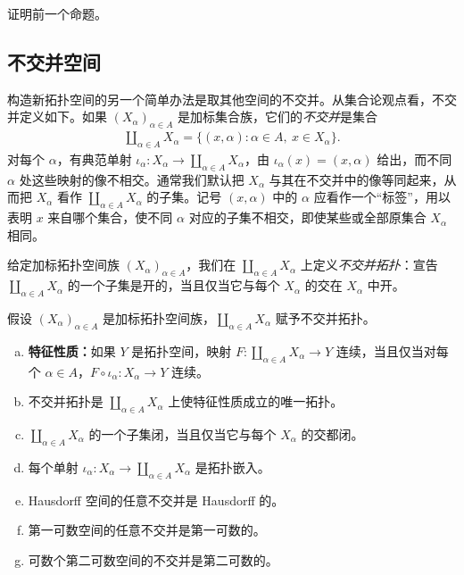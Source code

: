 \documentclass[../../main.tex]{subfiles}
\begin{document}
\begin{exercise}\label{exercise:appA-A-24}
证明前一个命题。
\end{exercise}

\subsection*{不交并空间}

构造新拓扑空间的另一个简单办法是取其他空间的不交并。从集合论观点看，不交并定义如下。如果 $(X_\alpha)_{\alpha\in A}$ 是加标集合族，它们的\emph{不交并}是集合
\begin{align*}
\coprod_{\alpha\in A}X_\alpha=\{(x,\alpha):\alpha\in A,\ x\in X_\alpha\}.
\end{align*}
对每个 $\alpha$，有典范单射 $\iota_\alpha:X_\alpha\to\coprod_{\alpha\in A}X_\alpha$，由 $\iota_\alpha(x)=(x,\alpha)$ 给出，而不同 $\alpha$ 处这些映射的像不相交。通常我们默认把 $X_\alpha$ 与其在不交并中的像等同起来，从而把 $X_\alpha$ 看作 $\coprod_{\alpha\in A}X_\alpha$ 的子集。记号 $(x,\alpha)$ 中的 $\alpha$ 应看作一个“标签”，用以表明 $x$ 来自哪个集合，使不同 $\alpha$ 对应的子集不相交，即使某些或全部原集合 $X_\alpha$ 相同。

给定加标拓扑空间族 $(X_\alpha)_{\alpha\in A}$，我们在 $\coprod_{\alpha\in A}X_\alpha$ 上定义\emph{不交并拓扑}：宣告 $\coprod_{\alpha\in A}X_\alpha$ 的一个子集是开的，当且仅当它与每个 $X_\alpha$ 的交在 $X_\alpha$ 中开。

\begin{proposition}[不交并拓扑的性质]\label{proposition:appA-disjoint-union-properties}
假设 $(X_\alpha)_{\alpha\in A}$ 是加标拓扑空间族，$\coprod_{\alpha\in A}X_\alpha$ 赋予不交并拓扑。
\begin{enumerate}[(a)]
\item \textbf{特征性质：}如果 $Y$ 是拓扑空间，映射 $F:\coprod_{\alpha\in A}X_\alpha\to Y$ 连续，当且仅当对每个 $\alpha\in A$，$F\circ\iota_\alpha:X_\alpha\to Y$ 连续。
\item 不交并拓扑是 $\coprod_{\alpha\in A}X_\alpha$ 上使特征性质成立的唯一拓扑。
\item $\coprod_{\alpha\in A}X_\alpha$ 的一个子集闭，当且仅当它与每个 $X_\alpha$ 的交都闭。
\item 每个单射 $\iota_\alpha:X_\alpha\to\coprod_{\alpha\in A}X_\alpha$ 是拓扑嵌入。
\item Hausdorff 空间的任意不交并是 Hausdorff 的。
\item 第一可数空间的任意不交并是第一可数的。
\item 可数个第二可数空间的不交并是第二可数的。
\end{enumerate}
\end{proposition}
\end{document}
